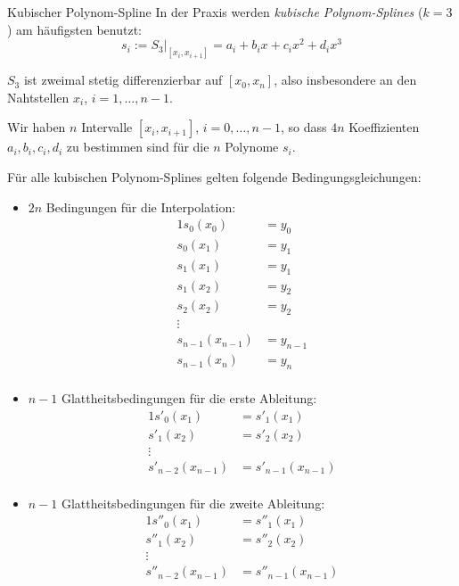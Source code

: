 \begin{defi}{Kubischer Polynom-Spline}
    In der Praxis werden \emph{kubische Polynom-Splines} ($k = 3$) am häufigsten benutzt:
    \[ 
        s_i := S_3|_{[x_i, x_{i+1}]} = a_i + b_i x + c_i x^2 + d_i x^3
    \]
    
    $S_3$ ist zweimal stetig differenzierbar auf $[x_0, x_n]$, also insbesondere an den Nahtstellen $x_i$, $i = 1, \ldots, n-1$.
    
    Wir haben $n$ Intervalle $[x_i, x_{i+1}]$, $i = 0, \ldots, n-1$, so dass $4n$ Koeffizienten $a_i, b_i, c_i, d_i$ zu bestimmen sind für die $n$ Polynome $s_i$. 
    
    Für alle kubischen Polynom-Splines gelten folgende Bedingungsgleichungen: 
    \begin{itemize}
        \item $2n$ Bedingungen für die Interpolation:
              \begin{alignat*}{1}
                  s_0(x_0)         & = y_0     \\
                  s_0(x_1)         & = y_1     \\
                  s_1(x_1)         & = y_1     \\
                  s_1(x_2)         & = y_2     \\
                  s_2(x_2)         & = y_2     \\
                  \vdots           &           \\
                  s_{n-1}(x_{n-1}) & = y_{n-1} \\
                  s_{n-1}(x_n)     & = y_n     \\
              \end{alignat*}
        \item $n-1$ Glattheitsbedingungen für die erste Ableitung:
              \begin{alignat*}{1}
                  s'_0(x_1)         & = s'_1(x_1)         \\
                  s'_1(x_2)         & = s'_2(x_2)         \\
                  \vdots            &                     \\
                  s'_{n-2}(x_{n-1}) & = s'_{n-1}(x_{n-1}) \\
              \end{alignat*}
        \item $n-1$ Glattheitsbedingungen für die zweite Ableitung:
              \begin{alignat*}{1}
                  s''_0(x_1)         & = s''_1(x_1)         \\
                  s''_1(x_2)         & = s''_2(x_2)         \\
                  \vdots             &                      \\
                  s''_{n-2}(x_{n-1}) & = s''_{n-1}(x_{n-1}) \\
              \end{alignat*}
    \end{itemize}
    

\end{defi}

